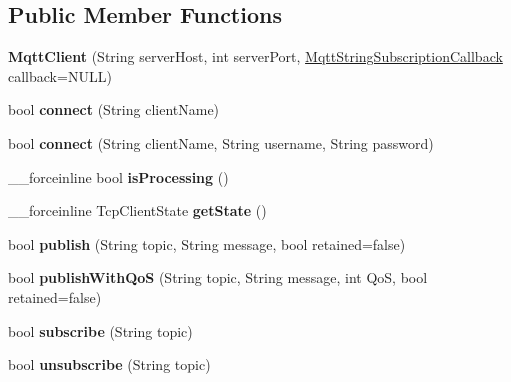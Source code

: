 \subsection*{Public Member Functions}
\begin{DoxyCompactItemize}
\item 
\hypertarget{class_mqtt_client_ae81fd0caf267d95579f2b17689a94b9d}{}{\bfseries Mqtt\+Client} (String server\+Host, int server\+Port, \hyperlink{class_delegate}{Mqtt\+String\+Subscription\+Callback} callback=N\+U\+L\+L)\label{class_mqtt_client_ae81fd0caf267d95579f2b17689a94b9d}

\item 
\hypertarget{class_mqtt_client_a5254838ca1080dea6678ab1502381865}{}bool {\bfseries connect} (String client\+Name)\label{class_mqtt_client_a5254838ca1080dea6678ab1502381865}

\item 
\hypertarget{class_mqtt_client_a155b0c0aa5b18eb99d9cac49e7537d64}{}bool {\bfseries connect} (String client\+Name, String username, String password)\label{class_mqtt_client_a155b0c0aa5b18eb99d9cac49e7537d64}

\item 
\hypertarget{class_mqtt_client_ae79eaa6ffbd4b60073660f19372bb231}{}\+\_\+\+\_\+forceinline bool {\bfseries is\+Processing} ()\label{class_mqtt_client_ae79eaa6ffbd4b60073660f19372bb231}

\item 
\hypertarget{class_mqtt_client_ab9ec80e0dc68f1b5876d6bc0907c0649}{}\+\_\+\+\_\+forceinline Tcp\+Client\+State {\bfseries get\+State} ()\label{class_mqtt_client_ab9ec80e0dc68f1b5876d6bc0907c0649}

\item 
\hypertarget{class_mqtt_client_a8e2571378d6466093b36d411472d0e75}{}bool {\bfseries publish} (String topic, String message, bool retained=false)\label{class_mqtt_client_a8e2571378d6466093b36d411472d0e75}

\item 
\hypertarget{class_mqtt_client_a522c102c900fc19939c3995162abb56f}{}bool {\bfseries publish\+With\+Qo\+S} (String topic, String message, int Qo\+S, bool retained=false)\label{class_mqtt_client_a522c102c900fc19939c3995162abb56f}

\item 
\hypertarget{class_mqtt_client_ad3b2e16ea29d7171fe8afc727b2964f5}{}bool {\bfseries subscribe} (String topic)\label{class_mqtt_client_ad3b2e16ea29d7171fe8afc727b2964f5}

\item 
\hypertarget{class_mqtt_client_a648ef9e9a4d2858b08a2d378da105f96}{}bool {\bfseries unsubscribe} (String topic)\label{class_mqtt_client_a648ef9e9a4d2858b08a2d378da105f96}

\end{DoxyCompactItemize}
